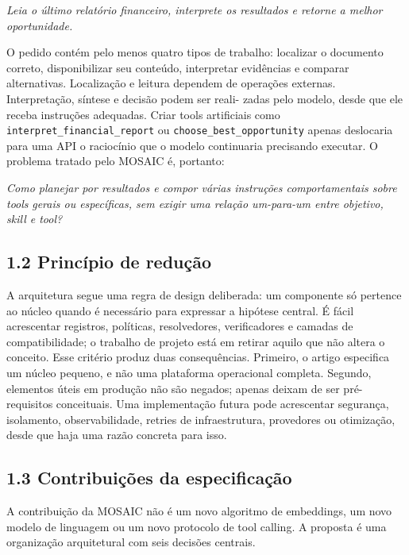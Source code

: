 \documentclass[12pt,a4paper]{article}
\begin{document}
\textit{Leia o último relatório financeiro, interprete os resultados e retorne a melhor oportunidade.}



O pedido contém pelo menos quatro tipos de trabalho: localizar o documento correto, disponibilizar seu conteúdo, interpretar evidências e comparar alternativas. Localização e leitura dependem de operações externas. Interpretação, síntese e decisão podem ser reali- zadas pelo modelo, desde que ele receba instruções adequadas. Criar tools artificiais como \nolinkurl{interpret_financial_report} ou \nolinkurl{choose_best_opportunity} apenas deslocaria para uma API o raciocínio que o modelo continuaria precisando executar. O problema tratado pelo MOSAIC é, portanto:


\textit{Como planejar por resultados e compor várias instruções comportamentais sobre tools} \textit{gerais ou específicas, sem exigir uma relação um-para-um entre objetivo, skill e tool?}


\subsection*{1.2 Princípio de redução}

A arquitetura segue uma regra de design deliberada: um componente só pertence ao núcleo quando é necessário para expressar a hipótese central. É fácil acrescentar registros, políticas, resolvedores, verificadores e camadas de compatibilidade; o trabalho de projeto está em retirar aquilo que não altera o conceito. Esse critério produz duas consequências. Primeiro, o artigo especifica um núcleo pequeno, e não uma plataforma operacional completa. Segundo, elementos úteis em produção não são negados; apenas deixam de ser pré-requisitos conceituais. Uma implementação futura pode acrescentar segurança, isolamento, observabilidade, retries de infraestrutura, provedores ou otimização, desde que haja uma razão concreta para isso.


\subsection*{1.3 Contribuições da especificação}

A contribuição da MOSAIC não é um novo algoritmo de embeddings, um novo modelo de linguagem ou um novo protocolo de tool calling. A proposta é uma organização arquitetural com seis decisões centrais.


\end{document}

